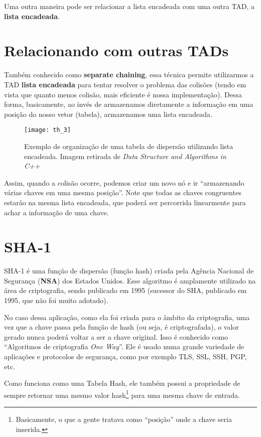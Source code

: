 \documentclass[12pt, a4paper]{article}
\begin{document}
Uma outra maneira pode ser relacionar a lista encadeada com uma outra TAD, a \textbf{lista encadeada}.

\section{Relacionando com outras TADs}
Também conhecido como \textbf{separate chaining}, essa técnica permite utilizarmos a TAD \textbf{lista encadeada} para tentar resolver o problema das colisões (tendo em vista que quanto menos colisão, mais eficiente é nossa implementação). Dessa forma, basicamente, ao invés de armazenamos diretamente a informação em uma posição do nosso vetor (tabela), armazenamos uma lista encadeada.

\begin{figure}[!ht]
\centering
\texttt{[image: th\_3]}
\caption{Exemplo de organização de uma tabela de dispersão utilizando lista encadeada. Imagem retirada de \textit{Data Structure and Algorithms in C++}\cite{Weiss:1998:DSA:521187}}
\label{hash3}
\end{figure}

Assim, quando a colisão ocorre, podemos criar um novo nó e ir ``armazenando várias chaves em uma mesma posição''. Note que todas as chaves congruentes estarão na mesma lista encadeada, que poderá ser percorrida linearmente para achar a informação de uma chave.

\section{SHA-1 \cite{wiki:sha}}

SHA-1 é uma função de dispersão (função hash) criada pela Agência Nacional de Segurança (\textbf{NSA}) dos Estados Unidos. Esse algoritmo é amplamente utilizado na área de criptografia, sendo publicado em 1995 (sucessor do SHA, publicado em 1995, que não foi muito adotado).

No caso dessa aplicação, como ela foi criada para o âmbito da criptografia, uma vez que a chave passa pela função de hash (ou seja, é criptografada), o valor gerado nunca poderá voltar a ser a chave original. Isso é conhecido como ``Algoritmos de criptografia \textit{One Way}''. Ele é usado numa grande variedade de aplicações e protocolos de segurança, como por exemplo TLS, SSL, SSH, PGP, etc.

Como funciona como uma Tabela Hash, ele também possui a propriedade de sempre retornar uma mesmo valor hash\footnote{Basicamente, o que a gente tratava como ``posição'' onde a chave seria inserida.} para uma mesma chave de entrada.
\end{document}
